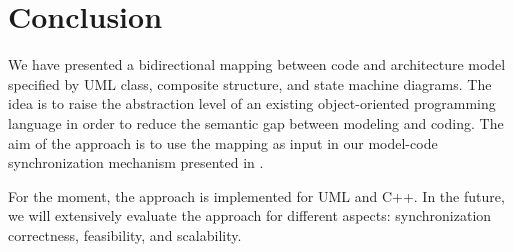 \section{Conclusion}
\label{sec:conclusion}
We have presented a bidirectional mapping between code and architecture model specified by UML class, composite structure, and state machine diagrams.
The idea is to raise the abstraction level of an existing object-oriented programming language in order to reduce the semantic gap between modeling and coding.
The aim of the approach is to use the mapping as input in our model-code synchronization mechanism presented in \cite{foster2016}.

  

For the moment, the approach is implemented for UML and C++.
In the future, we will extensively evaluate the approach for different aspects: synchronization correctness, feasibility, and scalability. 
 


